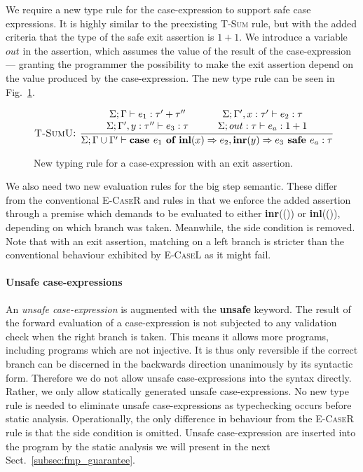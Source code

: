 We require a new type rule for the case-expression to support safe case
expressions. It is highly similar to the preexisting \textsc{T-Sum} rule, but
with the added criteria that the type of the safe exit assertion is $1 + 1$. We
introduce a variable $out$ in the assertion, which assumes the value of the
result of the case-expression --- granting the programmer the possibility to
make the exit assertion depend on the value produced by the case-expression.
The new type rule can be seen in Fig.~\ref{math:case_typing}.

\begin{figure}[t]
\begin{align*}
  \textsc{T-SumU: }
    \dfrac
      {\begin{array}{ccccc}
       \Sigma;\Gamma\vdash e_1 : \tau' + \tau'' & \quad &
       \Sigma; \Gamma', x : \tau' \vdash e_2 : \tau \\
       \Sigma; \Gamma', y : \tau'' \vdash e_3 : \tau & &
       \Sigma; out : \tau \vdash e_a : 1 + 1
       \end{array}}
       {\Sigma;\Gamma\cup\Gamma'\vdash \textbf{case } e_1 \textbf{ of } \textbf{inl}(x) \Rightarrow e_2, \textbf{inr}(y) \Rightarrow e_3 \textbf{ safe } e_a : \tau}
\end{align*}
\caption{New typing rule for a case-expression with an exit
assertion.}\label{math:case_typing}
\end{figure}

We also need two new evaluation rules for the big step semantic. These differ
from the conventional \textsc{E-CaseR} and  rules in that we
enforce the added assertion through a premise which demands to be evaluated to
either \textbf{inr}(()) or \textbf{inl}(()), depending on which branch was
taken. Meanwhile, the side condition is removed. Note that with an exit
assertion, matching on a left branch is stricter than the conventional
behaviour exhibited by \textsc{E-CaseL} as it might fail.

\paragraph{Unsafe case-expressions}

An \emph{unsafe case-expression} is augmented with the \textbf{unsafe} keyword.
The result of the forward evaluation of a case-expression is not subjected to
any validation check when the right branch is taken. This means it allows more
programs, including programs which are not injective. It is thus only
reversible if the correct branch can be discerned in the backwards direction
unanimously by its syntactic form. Therefore we do not allow unsafe
case-expressions into the syntax directly. Rather, we only allow statically
generated unsafe case-expressions. No new type rule is needed to eliminate
unsafe case-expressions as typechecking occurs before static analysis.
Operationally, the only difference in behaviour from the \textsc{E-CaseR} rule
is that the side condition is omitted. Unsafe case-expression are inserted into
the program by the static analysis we will present in the next
Sect.~\ref{subsec:fmp_guarantee}.


